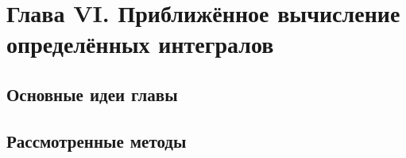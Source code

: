 \newpage
{}
\pagestyle{empty}
\vspace{0.5cm}

\section*{Глава VI. Приближённое вычисление определённых интегралов}

\subsection{Основные идеи главы} 

\subsection{Рассмотренные методы}
